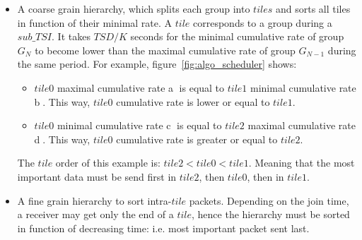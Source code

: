\documentclass[a4paper]{article}
\begin{document}
        \begin{itemize}
            \item{
                A coarse grain hierarchy, which splits each group into $tiles$
                    and sorts all tiles in function of their minimal rate. A
                    $tile$ corresponds to a group during a $sub\_TSI$.  It takes
                    $TSD/K$ seconds for the minimal cumulative rate of group
                    $G_N$ to become lower than the maximal cumulative rate of
                    group $G_{N-1}$ during the same period. For example,
                          figure~\ref{fig:algo_scheduler} shows:
                    \begin{itemize}
                        \item{
                            $tile0$ maximal cumulative rate \textcircled{a} is
                                equal to $tile1$ minimal cumulative rate
                                \textcircled{b}. This way, $tile0$ cumulative
                                rate is lower or equal to $tile1$.
                        }
                        \item{
                            $tile0$ minimal cumulative rate \textcircled{c} is
                                equal to $tile2$ maximal cumulative rate
                                \textcircled{d}. This way, $tile0$ cumulative
                                rate is greater or equal to $tile2$.
                        }
                    \end{itemize}
                    The $tile$ order of this example is: $tile 2 < tile 0 <
                        tile 1$. Meaning that the most important data must be
                        send first in $tile2$, then $tile0$, then in $tile1$.
            }
            \item{
                A fine grain hierarchy to sort intra-$tile$ packets.  Depending
                    on the join time, a receiver may get only the end of a
                    $tile$, hence the hierarchy must be sorted in function of
                    decreasing time: i.e. most important packet sent last.
            }
        \end{itemize}
\end{document}

